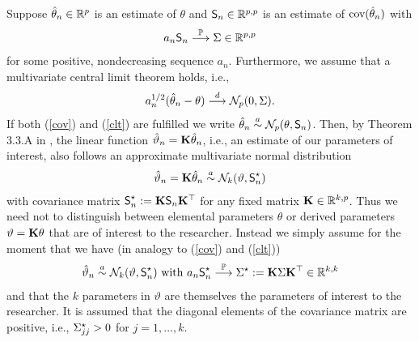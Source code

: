 \documentclass[12pt,a4paper]{article}
\begin{document}
Suppose $\hat{\theta}_n \in \mathbb{R}^p$ is an estimate of $\theta$ and
$\textsf{S}_n \in \mathbb{R}^{p,p}$ is an estimate of $\text{cov}(\hat{\theta}_n)$ with
\begin{eqnarray} \label{cov}
a_n \textsf{S}_n \stackrel{\mathbb{P}}{\longrightarrow} \Sigma \in \mathbb{R}^{p,p}
\end{eqnarray}
for some positive, nondecreasing sequence $a_n$.
Furthermore, we assume that a multivariate central limit theorem holds,
i.e.,
\begin{eqnarray} \label{clt}
a_n^{1/2} (\hat{\theta}_n - \theta) \stackrel{d}{\longrightarrow} \mathcal{N}_p(0, \Sigma).
\end{eqnarray}
If both (\ref{cov}) and (\ref{clt}) are fulfilled we write $\hat{\theta}_n \stackrel{a}{\sim}
\mathcal{N}_p(\theta, \textsf{S}_n)$. Then, by Theorem 3.3.A in
\cite{Serfling1980}, the linear function $\hat{\vartheta}_n = \mathbf{K}
\hat{\theta}_n$, i.e., an estimate of our parameters of interest, 
also follows an approximate multivariate normal 
distribution
\begin{eqnarray*}
\hat{\vartheta}_n = \mathbf{K} \hat{\theta}_n \stackrel{a}{\sim} \mathcal{N}_k(\vartheta, \textsf{S}^\star_n)
\end{eqnarray*}
with covariance matrix $\textsf{S}^\star_n := \mathbf{K} \textsf{S}_n \mathbf{K}^\top$
for any fixed matrix $\mathbf{K} \in \mathbb{R}^{k,p}$. Thus we need not to distinguish
between elemental parameters $\theta$ or derived parameters $\vartheta = \mathbf{K} \theta$ 
that are of interest to the researcher. 
Instead we simply assume 
for the moment that we have (in analogy to (\ref{cov}) and (\ref{clt}))
\begin{eqnarray} \label{assume}
\hat{\vartheta}_n \stackrel{a}{\sim} \mathcal{N}_k(\vartheta, \textsf{S}^\star_n) \text{ with } 
a_n \textsf{S}^\star_n \stackrel{\mathbb{P}}{\longrightarrow} \Sigma^\star := \mathbf{K} \Sigma \mathbf{K}^\top \in \mathbb{R}^{k,k}
\end{eqnarray}
and that the $k$ parameters in $\vartheta$ are themselves the 
parameters of interest to the researcher. It is assumed that
the diagonal elements of the covariance matrix are positive, i.e., 
$\Sigma^\star_{jj} > 0$ for $j = 1, \dots, k$.
\end{document}
